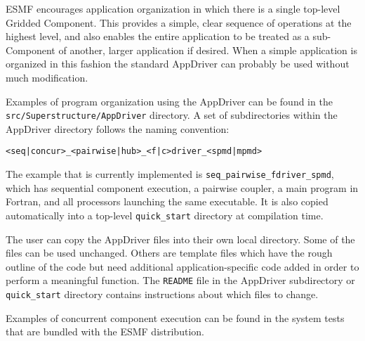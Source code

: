 %


ESMF encourages application organization in which there is a single 
top-level Gridded Component.  This provides a simple, clear sequence
of operations at the highest level, and also enables the entire 
application to be treated as a sub-Component of another, larger 
application if desired.  When a simple application is organized in this fashion 
the standard AppDriver can probably be used without much modification.  

Examples of program organization using the AppDriver can be found in the 
{\tt src/Superstructure/AppDriver} directory.  A set of subdirectories 
within the AppDriver directory follows the naming convention:
\begin{verbatim}
<seq|concur>_<pairwise|hub>_<f|c>driver_<spmd|mpmd>
\end{verbatim}

The example that is currently implemented is
{\tt seq\_pairwise\_fdriver\_spmd}, which
has sequential component execution, a pairwise coupler, a main program
in Fortran, and all processors launching the same executable.
It is also copied automatically into a top-level 
{\tt quick\_start} directory at compilation time.  

The user can copy the AppDriver files into
their own local directory. Some of the files can be used unchanged.
Others are template files which have the rough outline of the code but
need additional application-specific code added in order to perform a
meaningful function.  The {\tt README} file in the AppDriver 
subdirectory or {\tt quick\_start} directory contains instructions about 
which files to change.

Examples of concurrent component execution can be found in the
system tests that are bundled with the ESMF distribution.



